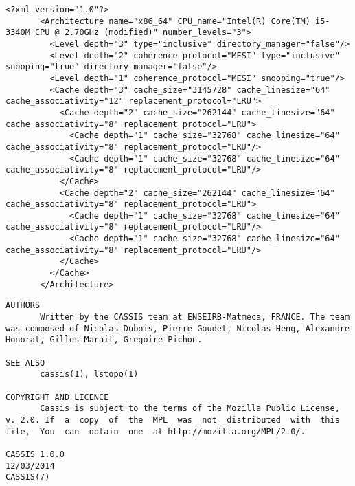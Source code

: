 \begin{lstlisting}[style=styleXml]
       <?xml version="1.0"?>
       <Architecture name="x86_64" CPU_name="Intel(R) Core(TM) i5-3340M CPU @ 2.70GHz (modified)" number_levels="3">
         <Level depth="3" type="inclusive" directory_manager="false"/>
         <Level depth="2" coherence_protocol="MESI" type="inclusive" snooping="true" directory_manager="false"/>
         <Level depth="1" coherence_protocol="MESI" snooping="true"/>
         <Cache depth="3" cache_size="3145728" cache_linesize="64" cache_associativity="12" replacement_protocol="LRU">
           <Cache depth="2" cache_size="262144" cache_linesize="64" cache_associativity="8" replacement_protocol="LRU">
             <Cache depth="1" cache_size="32768" cache_linesize="64" cache_associativity="8" replacement_protocol="LRU"/>
             <Cache depth="1" cache_size="32768" cache_linesize="64" cache_associativity="8" replacement_protocol="LRU"/>
           </Cache>
           <Cache depth="2" cache_size="262144" cache_linesize="64" cache_associativity="8" replacement_protocol="LRU">
             <Cache depth="1" cache_size="32768" cache_linesize="64" cache_associativity="8" replacement_protocol="LRU"/>
             <Cache depth="1" cache_size="32768" cache_linesize="64" cache_associativity="8" replacement_protocol="LRU"/>
           </Cache>
         </Cache>
       </Architecture>
\end{lstlisting}
\begin{lstlisting}[style=styleMan]
AUTHORS
       Written by the CASSIS team at ENSEIRB-Matmeca, FRANCE. The team was composed of Nicolas Dubois, Pierre Goudet, Nicolas Heng, Alexandre Honorat, Gilles Marait, Gregoire Pichon.

SEE ALSO
       cassis(1), lstopo(1)

COPYRIGHT AND LICENCE
       Cassis is subject to the terms of the Mozilla Public License, v. 2.0. If  a  copy  of  the  MPL  was  not  distributed  with  this  file,  You  can  obtain  one  at http://mozilla.org/MPL/2.0/.

CASSIS 1.0.0                                                                                                  12/03/2014                                                                                                     CASSIS(7)
\end{lstlisting}

